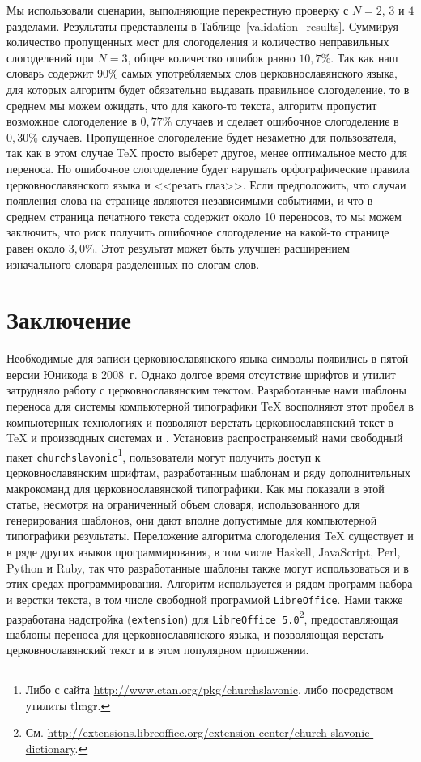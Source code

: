 \documentclass[12pt,a4paper,oneside]{extarticle}
\begin{document}
Мы использовали сценарии, выполняющие перекрестную проверку с $N = 2$, $3$ и $4$ разделами. Результаты представлены в Таблице~\ref{validation_results}. Суммируя количество пропущенных мест для слогоделения и количество неправильных слогоделений при  $N = 3$, общее количество ошибок равно $10,7\%$.  Так как наш словарь содержит $90\%$ самых употребляемых слов церковнославянского языка, для которых алгоритм будет обязательно выдавать правильное слогоделение, то в среднем мы можем ожидать, что для какого-то текста, алгоритм пропустит возможное слогоделение в $0,77\%$  случаев и сделает ошибочное слогоделение в $0,30\%$ случаев. Пропущенное слогоделение будет незаметно для пользователя, так как в этом случае \TeX{} просто выберет другое, менее оптимальное место для переноса. Но ошибочное слогоделение будет нарушать орфографические правила церковнославянского языка и <<резать глаз>>. Если предположить, что случаи появления слова на странице являются независимыми событиями, и что в среднем страница печатного текста содержит около 10 переносов, то мы можем заключить, что риск получить ошибочное слогоделение на какой-то странице равен около $3,0\%$. Этот результат может быть улучшен расширением изначального словаря разделенных по слогам слов.

\section{Заключение}

Необходимые для записи церковнославянского языка символы появились в пятой версии Юникода в 2008~г. Однако долгое время отсутствие шрифтов и утилит затрудняло работу с церковнославянским текстом. Разработанные нами шаблоны переноса для системы компьютерной типографики \TeX{} восполняют этот пробел в компьютерных технологиях и позволяют верстать церковнославянский текст в \TeX{} и производных системах \XeTeX{} и \LuaTeX{}. Установив распространяемый нами свободный пакет \texttt{churchslavonic}\footnote{Либо с сайта \url{http://www.ctan.org/pkg/churchslavonic}, либо посредством утилиты tlmgr.}, пользователи могут получить доступ к церковнославянским шрифтам, разработанным шаблонам и ряду дополнительных макрокоманд для церковнославянской типографики. Как мы показали в этой статье, несмотря на ограниченный объем словаря, использованного для генерирования шаблонов, они дают вполне допустимые для компьютерной типографики результаты. Переложение алгоритма слогоделения \TeX{}  существует и в ряде других языков программирования, в том числе Haskell, JavaScript, Perl, Python и Ruby, так что разработанные шаблоны также могут использоваться и в этих средах программирования. Алгоритм используется и рядом программ набора и верстки текста, в том числе свободной программой \verb+LibreOffice+. Нами также разработана надстройка (\verb+extension+) для \verb+LibreOffice 5.0+\footnote{См. \url{http://extensions.libreoffice.org/extension-center/church-slavonic-dictionary}.}, предоставляющая шаблоны переноса для церковнославянского языка, и позволяющая верстать церковнославянский текст и в этом популярном приложении.

\printbibliography
\end{document}
